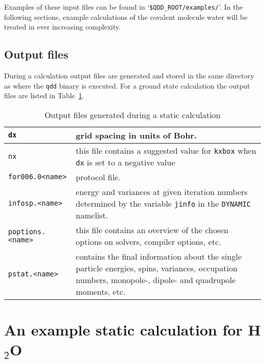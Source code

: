 \documentclass[11pt,a4paper]{article}
\begin{document}
		Examples of these input files can be found in `\texttt{\$QDD\_ROOT/examples/}'. In the following sections, example calculations of the covalent molecule water will be treated in ever increasing complexity.
			
		\subsection{Output files}
			During a calculation output files are generated and stored in the same directory as where the \texttt{qdd} binary is executed. For a ground state calculation the output files are listed in Table~\ref{tab:static-output-files}.
			\begin{table}[t]
				\caption{Output files generated during a static calculation}\label{tab:static-output-files}
				\begin{tabular}{|p{3.5cm}|p{11.2cm}|}
					\hline
					\texttt{dx}& grid spacing in units of Bohr.\\
					\hline
					\texttt{nx}& this file contains a suggested value for \texttt{kxbox} when \texttt{dx} is set to a negative value\\
					\hline
					\texttt{for006.0<name>}& protocol file.\\
					\hline
					\texttt{infosp.<name>}& energy and variances at given iteration numbers determined by the variable \texttt{jinfo} in the \texttt{DYNAMIC} namelist.\\
					\hline
					\texttt{poptions.<name>}& this file contains an overview of the chosen options on solvers, compiler options, etc.\\
					\hline
					\texttt{pstat.<name>}& contains the final information about the single particle energies, spins, variances, occupation numbers, monopole-, dipole- and quadrupole moments, etc.\\
					\hline
				\end{tabular}
			\end{table}
		
	\section{An example static calculation for H$_\mathsf{2}$O}
			
\end{document}
